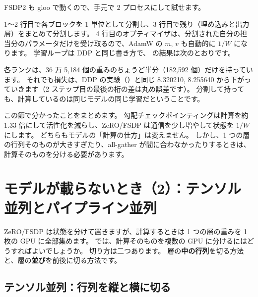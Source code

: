 FSDP2 も gloo で動くので、手元で 2 プロセスにして試せます。


1〜2 行目で各ブロックを 1 単位として分割し、3 行目で残り（埋め込みと出力層）をまとめて分割します。
4 行目のオプティマイザは、分割された自分の担当分のパラメータだけを受け取るので、AdamW の $m$, $v$ も自動的に $1/W$ になります。
学習ループは DDP と同じ書き方で、 の結果は次のとおりです。


各ランクは、36 万 5,184 個の重みのちょうど半分（182,592 個）だけを持っています。
それでも損失は、DDP の実験（）と同じ 8.320210, 8.255640 から下がっていきます（2 ステップ目の最後の桁の差は丸め誤差です）。
分割して持っても、計算しているのは同じモデルの同じ学習だということです。

この節で分かったことをまとめます。
勾配チェックポインティングは計算を約 1.33 倍にして活性化を減らし、ZeRO/FSDP は通信を少し増やして状態を $1/W$ にします。
どちらもモデルの「計算の仕方」は変えません。
しかし、1 つの層の行列そのものが大きすぎたり、all-gather が間に合わなかったりするときは、計算そのものを分ける必要があります。

\section{モデルが載らないとき（2）：テンソル並列とパイプライン並列}\label{sec:dist-mp}

ZeRO/FSDP は状態を分けて置きますが、計算するときは 1 つの層の重みを 1 枚の GPU に全部集めます。
では、計算そのものを複数の GPU に分けるにはどうすればよいでしょうか。
切り方は二つあります。
層の\textbf{中の行列}を切る方法と、層の\textbf{並び}を前後に切る方法です。

\subsection*{テンソル並列：行列を縦と横に切る}

